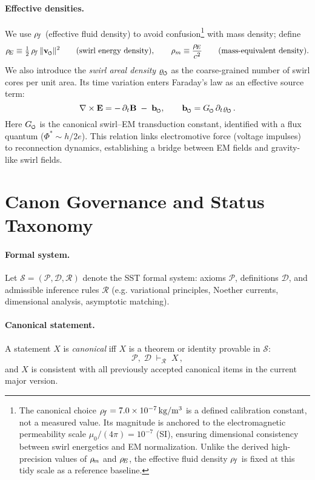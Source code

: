 \documentclass[11pt]{article}
\begin{document}
    \paragraph{Effective densities.}
        We use $\rho_{\!f}$ (effective fluid density) to avoid confusion\footnote{The canonical choice
    $\rho_{\!f} = 7.0\times 10^{-7}\,\mathrm{kg/m^3}$
    is a defined calibration constant, not a measured value.
    Its magnitude is anchored to the electromagnetic permeability scale
    $\mu_0/(4\pi) = 10^{-7}$ (SI), ensuring dimensional consistency between swirl energetics and EM normalization.
    Unlike the derived high-precision values of $\rho_{\!m}$ and $\rho_{\!E}$,
    the effective fluid density $\rho_{\!f}$ is fixed at this tidy scale as a reference baseline.}
        with mass density; define
        \[
            \rhoE \equiv \tfrac{1}{2}\,\rhof\,\vnorm^2 \qquad (\text{swirl energy density}), \qquad
            \rho_m \equiv \frac{\rhoE}{c^2} \qquad (\text{mass-equivalent density}).
        \]
        We also introduce the \emph{swirl areal density} $\varrho_{\swirlarrow}$ as the coarse-grained number of swirl cores per unit area. Its time variation enters Faraday's law as an effective source term:
        \[
            \nabla \times \mathbf{E} = -\,\partial_t \mathbf{B} \;-\; \mathbf{b}_{\swirlarrow}, \qquad
            \mathbf{b}_{\swirlarrow} = G_{\swirlarrow}\,\partial_t \varrho_{\swirlarrow}\,.
        \]
        Here $G_{\swirlarrow}$ is the canonical swirl–EM transduction constant, identified with a flux quantum ($\Phi^* \sim h/2e$). This relation links electromotive force (voltage impulses) to reconnection dynamics, establishing a bridge between EM fields and gravity-like swirl fields.

\section{Canon Governance and Status Taxonomy}
\label{sec:canon_governance}
\paragraph{Formal system.}
    Let $\mathcal{S}=(\mathcal{P},\mathcal{D},\mathcal{R})$ denote the SST formal system: axioms $\mathcal{P}$, definitions $\mathcal{D}$, and admissible inference rules $\mathcal{R}$ (e.g. variational principles, Noether currents, dimensional analysis, asymptotic matching).

\paragraph{Canonical statement.}
    A statement $X$ is \emph{canonical} iff $X$ is a theorem or identity provable in $\mathcal{S}$:
    \[
        \mathcal{P},\;\mathcal{D}\;\vdash_{\mathcal{R}}\;X\,,
    \]
    and $X$ is consistent with all previously accepted canonical items in the current major version.
\end{document}
